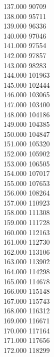 { 137.000	90709 \\
 138.000	95711 \\
 139.000	96336 \\
 140.000	97046 \\
 141.000	97554 \\
 142.000	97857 \\
 143.000	98283 \\
 144.000	101963 \\
 145.000	102444 \\
 146.000	103065 \\
 147.000	103400 \\
 148.000	104186 \\
 149.000	104385 \\
 150.000	104847 \\
 151.000	105320 \\
 152.000	105902 \\
 153.000	106505 \\
 154.000	107017 \\
 155.000	107653 \\
 156.000	108264 \\
 157.000	110923 \\
 158.000	111308 \\
 159.000	111728 \\
 160.000	112163 \\
 161.000	112730 \\
 162.000	113106 \\
 163.000	113902 \\
 164.000	114298 \\
 165.000	114678 \\
 166.000	115148 \\
 167.000	115743 \\
 168.000	116312 \\
 169.000	116671 \\
 170.000	117164 \\
 171.000	117656 \\
 172.000	118299 \\
}
